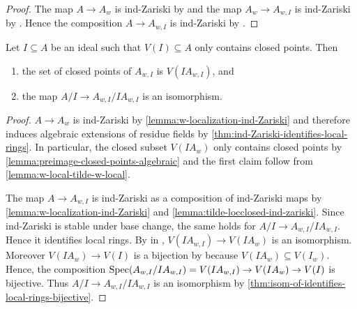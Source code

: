 \begin{proof}
  \leanok
  The map $A \to A_w$ is ind-Zariski by  and
  the map $A_w \to A_{w, I}$ is ind-Zariski by .
  Hence the composition $A \to A_{w, I}$ is ind-Zariski by .
\end{proof}

\begin{lemma}
    \label{lemma:closed-closed-points-tilde-w-local}
    \leanok
    Let $I \subseteq A$ be an ideal such that $V(I) \subseteq A$ only contains closed points. Then
    \begin{enumerate}
        \item the set of closed points of $A_{w, I}$ is $V(IA_{w, I})$, and
        \item the map $A / I \to A_{w, I} / I A_{w, I}$ is an isomorphism. \label{item:closed-closed-points-tilde-w-local-quot-isom}
    \end{enumerate}
\end{lemma}

\begin{proof}
    \leanok
    $A \to A_w$ is ind-Zariski by \ref{lemma:w-localization-ind-Zariski} and therefore induces
    algebraic extensions of residue fields by \ref{thm:ind-Zariski-identifies-local-rings}.
    In particular, the closed subset $V(I A_w)$ only contains
    closed points by \ref{lemma:preimage-closed-points-algebraic} and
    the first claim follow from \ref{lemma:w-local-tilde-w-local}.

    The map $A \to A_{w, I}$ is ind-Zariski as a composition of ind-Zariski maps by
    \ref{lemma:w-localization-ind-Zariski} and \ref{lemma:tilde-locclosed-ind-zariski}.
    Since ind-Zariski is stable under base change, the same holds for $A/I \to A_{w, I}/IA_{w, I}$.
    Hence it identifies local rings. By  in ,
    $V(IA_{w, I}) \to V(I A_w)$ is an isomorphism. Moreover
    $V(I A_{w}) \to V(I)$ is a bijection by 
    because $V(I A_{w}) \subseteq V(I_w)$. Hence, the composition
    $\mathrm{Spec}(A_{w, I} / I A_{w, I}) = V(I A_{w, I}) \to V(I A_w) \to V(I)$ is bijective. Thus
    $A / I \to A_{w, I} / I A_{w, I}$ is an isomorphism by \ref{thm:isom-of-identifies-local-rings-bijective}.
\end{proof}

